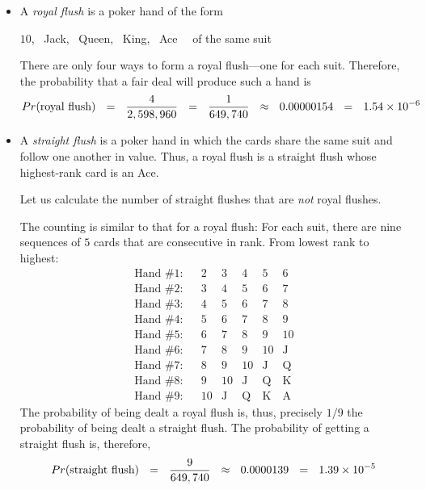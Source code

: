  
\begin{itemize}
\item
A {\it royal flush} is a poker hand of the form

\smallskip

\hspace*{.25in}$10$, \ {\sc Jack}, \ {\sc Queen}, \ {\sc King}, \ {\sc Ace} \ \ of the same suit

\smallskip

\noindent
There are only four ways to form a royal flush---one for each suit.  Therefore, the probability that
a fair deal will produce such a hand is
\[ 
Pr(\mbox{royal flush}) \ \ = \ \
\frac{4}{2,598,960} \ \ = \ \ {1 \over {649,740}} \ \ \approx \ \ 0.00000154 \ \ = \ \ 1.54 \times 10^{-6} \]

\item
A {\it straight flush} is a poker hand in which the cards share the same suit and follow one 
another in value.  Thus, a royal flush is a straight flush whose highest-rank card is an {\sc Ace}.

\medskip

Let us calculate the number of straight flushes that are {\em not} royal flushes.

\smallskip

The counting is similar to that for a royal flush:  For each suit, there are nine sequences of $5$ cards that are consecutive in rank.  From lowest rank to highest:
\[ \begin{array}{llccccc}
\mbox{Hand \#1}: & &
2 & 3 & 4 & 5 & 6 \\
\mbox{Hand \#2}: & &
3 & 4 & 5 & 6 & 7 \\
\mbox{Hand \#3}: & &
4 & 5 & 6 & 7 & 8 \\
\mbox{Hand \#4}: & &
5 & 6 & 7 & 8 & 9 \\
\mbox{Hand \#5}: & &
6 & 7 & 8 & 9 & 10 \\
\mbox{Hand \#6}: & &
7 & 8 & 9 & 10 &  \mbox{J} \\
\mbox{Hand \#7}: & &
8 & 9 & 10 &  \mbox{J} &   \mbox{Q} \\
\mbox{Hand \#8}: & &
9 & 10 &  \mbox{J} & \mbox{Q} &  \mbox{K}  \\
\mbox{Hand \#9}: & &
10 &  \mbox{J}
     & \mbox{Q}
     & \mbox{K}
     & \mbox{A}
\end{array} \]
The probability of being dealt a royal flush is, thus, precisely $1/9$ the probability of being dealt a straight flush.  The probability of getting a straight flush is, therefore,
\[  Pr(\mbox{straight flush}) \ \ = \ \
{9 \over {649,740}} \ \ \approx \ \ 0.0000139  \ \ = \ \ 1.39 \times 10^{-5} \]


\end{itemize}
